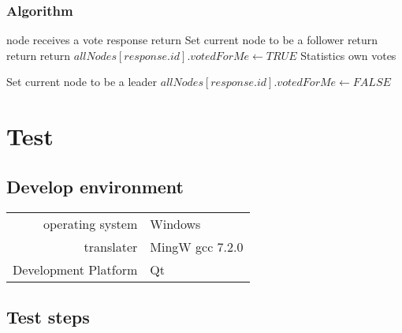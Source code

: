 \documentclass{report}
\begin{document}
\subsubsection{Algorithm}
\begin{simpleAlgorithm}{node receives a vote response}
        \State return
    \EndIf
        \State Set current node to be a follower
        \State {}
        \State return
    \EndIf
     
        \State return
    \EndIf
     
        \State return
    \EndIf
     
        \State $allNodes[response.id].votedForMe \gets TRUE$
        \State Statistics own votes

         
            \State Set current node to be a leader
            \State {}
        \Else
            \State $allNodes[response.id].votedForMe \gets FALSE$
        \EndIf
    \EndIf
   \EndProcedure
\end{simpleAlgorithm}

\section{Test}
\subsection{Develop environment}

\begin{tabular}{r l}
    operating system & Windows \\
    translater & MingW gcc 7.2.0 \\
    Development Platform & Qt \\
\end{tabular}

\subsection{Test steps}
\end{document}
